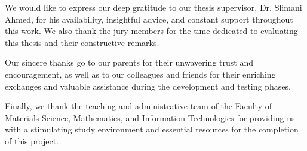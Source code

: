 
We would like to express our deep gratitude to our thesis supervisor, Dr. Slimani Ahmed, for his availability, insightful advice, and constant support throughout this work. We also thank the jury members for the time dedicated to evaluating this thesis and their constructive remarks.

Our sincere thanks go to our parents for their unwavering trust and encouragement, as well as to our colleagues and friends for their enriching exchanges and valuable assistance during the development and testing phases.

Finally, we thank the teaching and administrative team of the Faculty of Materials Science, Mathematics, and Information Technologies for providing us with a stimulating study environment and essential resources for the completion of this project.

\clearpage